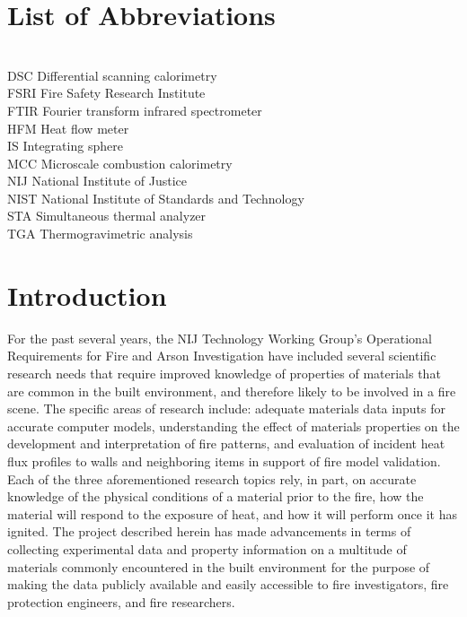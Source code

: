 \documentclass[12pt,oneside]{book}
\begin{document}
\chapter*{List of Abbreviations}

\begin{tabbing}
\hspace{1.5in} \= \\
DSC 	\> Differential scanning calorimetry \\
FSRI    \> Fire Safety Research Institute \\
FTIR 	\> Fourier transform infrared spectrometer \\
HFM 	\> Heat flow meter \\
IS 		\> Integrating sphere \\
MCC 	\> Microscale combustion calorimetry \\
NIJ 	\> National Institute of Justice \\
NIST    \> National Institute of Standards and Technology \\
STA 	\> Simultaneous thermal analyzer \\
TGA 	\> Thermogravimetric analysis \\
\end{tabbing}

\newpage

\setcounter{page}{1}

\newpage
\mainmatter
\newpage

\chapter{Introduction}
\label{sec:introduction}

For the past several years, the NIJ Technology Working Group's Operational Requirements for Fire and Arson Investigation have included several scientific research needs that require improved knowledge of properties of materials that are common in the built environment, and therefore likely to be involved in a fire scene. The specific areas of research include: adequate materials data inputs for accurate computer models, understanding the effect of materials properties on the development and interpretation of fire patterns, and evaluation of incident heat flux profiles to walls and neighboring items in support of fire model validation. Each of the three aforementioned research topics rely, in part, on accurate knowledge of the physical conditions of a material prior to the fire, how the material will respond to the exposure of heat, and how it will perform once it has ignited. The project described herein has made advancements in terms of collecting experimental data and property information on a multitude of materials commonly encountered in the built environment for the purpose of making the data publicly available and easily accessible to fire investigators, fire protection engineers, and fire researchers.
\end{document}

